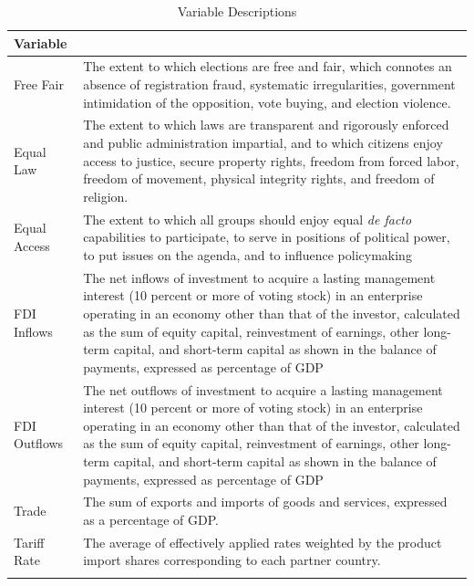 \begin{table}[!h]
\centering
\caption{\centering Variable Descriptions}
\centering
\fontsize{10}{12}\selectfont
\begin{tabular}[t]{>{\raggedright\arraybackslash}p{3cm}>{\raggedright\arraybackslash}p{12cm}}
\toprule
Variable & \multicolumn{1}{c}{Description}\\
\midrule
Free Fair & The extent to which elections are free and fair, which connotes an
    absence of registration fraud, systematic irregularities,
    government intimidation of the opposition, vote buying, and election
    violence.\\
\addlinespace[1.2ex]
Equal Law & The extent to which laws are transparent and rigorously enforced and
    public administration impartial, and to which citizens enjoy access to
    justice, secure property rights, freedom from forced labor,
    freedom of movement, physical integrity rights, and freedom of religion.\\
\addlinespace[1.2ex]
Equal Access & The extent to which all groups should enjoy equal \textit{de facto}
    capabilities to participate, to serve in positions of political power, to
    put issues on the agenda, and to influence policymaking\\
\addlinespace[1.2ex]
FDI Inflows & The net inflows of investment to acquire a lasting management interest (10
    percent or more of voting stock) in an enterprise operating in an economy
    other than that of the investor, calculated as the sum of equity capital,
    reinvestment of earnings, other long-term capital, and short-term capital
    as shown in the balance of payments, expressed as percentage of \vphantom{1} GDP\\
\addlinespace[1.2ex]
FDI Outflows & The net outflows of investment to acquire a lasting management interest (10
    percent or more of voting stock) in an enterprise operating in an economy
    other than that of the investor, calculated as the sum of equity capital,
    reinvestment of earnings, other long-term capital, and short-term capital
    as shown in the balance of payments, expressed as percentage of GDP\\
\addlinespace[1.2ex]
Trade & The sum of exports and imports of goods and services, expressed as a
    percentage of GDP.\\
\addlinespace[1.2ex]
Tariff Rate & The average of effectively applied rates weighted by the product import
    shares corresponding to each partner country.\\
\addlinespace[1.2ex]

\end{tabular}
\end{table}
